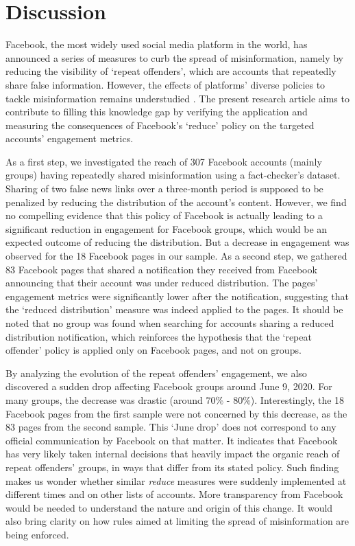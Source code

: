 \documentclass[11pt,a4paper]{article}
\begin{document}
\section{Discussion}

Facebook, the most widely used social media platform in the world, has announced a series of measures to curb the spread of misinformation, namely by reducing the visibility of `repeat offenders', which are accounts that repeatedly share false information. 
However, the effects of platforms' diverse policies to tackle misinformation remains understudied \citep{pasquetto2020tackling}. 
The present research article aims to contribute to filling this knowledge gap by verifying the application and measuring the consequences of Facebook's `reduce' policy on the targeted accounts' engagement metrics.

As a first step, we investigated the reach of 307 Facebook accounts (mainly groups) having repeatedly shared misinformation using a fact-checker's dataset. 
Sharing of two false news links over a three-month period is supposed to be penalized by reducing the distribution of the account's content.
However, we find no compelling evidence that this policy of Facebook is actually leading to a significant reduction in engagement for Facebook groups, which would be an expected outcome of reducing the distribution. 
But a decrease in engagement was observed for the 18 Facebook pages in our sample. 
As a second step, we gathered 83 Facebook pages that shared a notification they received from Facebook announcing that their account was under reduced distribution.
The pages' engagement metrics were significantly lower after the notification, suggesting that the `reduced distribution' measure was indeed applied to the pages.
It should be noted that no group was found when searching for accounts sharing a reduced distribution notification, which reinforces the hypothesis that the `repeat offender' policy is applied only on Facebook pages, and not on groups.

By analyzing the evolution of the repeat offenders’ engagement, we also discovered a sudden drop affecting Facebook groups around June 9, 2020.
For many groups, the decrease was drastic (around $70\%$ - $80\%$).
Interestingly, the 18 Facebook pages from the first sample were not concerned by this decrease, as the 83 pages from the second sample.
This `June drop' does not correspond to any official communication by Facebook on that matter. 
It indicates that Facebook has very likely taken internal decisions that heavily impact the organic reach of repeat offenders' groups, in ways that differ from its stated policy. 
Such finding makes us wonder whether similar {\it reduce} measures were suddenly implemented at different times and on other lists of accounts.
More transparency from Facebook would be needed to understand the nature and origin of this change. 
It would also bring clarity on how rules aimed at limiting the spread of misinformation are being enforced.
\end{document}
